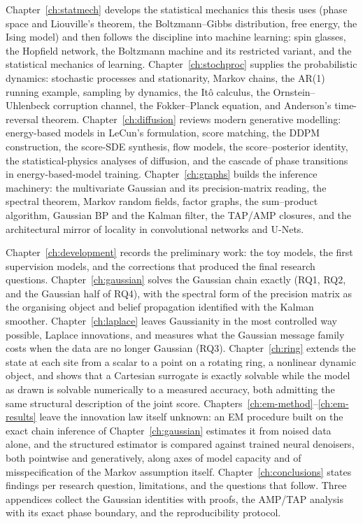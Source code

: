 Chapter~\ref{ch:statmech} develops the statistical mechanics this thesis
uses (phase space and Liouville's theorem, the Boltzmann--Gibbs
distribution, free energy, the Ising model) and then follows the
discipline into machine learning: spin glasses, the Hopfield network,
the Boltzmann machine and its restricted variant, and the statistical
mechanics of learning. Chapter~\ref{ch:stochproc} supplies the
probabilistic dynamics: stochastic processes and stationarity, Markov
chains, the AR(1) running example, sampling by dynamics, the It\^o
calculus, the Ornstein--Uhlenbeck corruption channel, the Fokker--Planck
equation, and Anderson's time-reversal theorem.
Chapter~\ref{ch:diffusion} reviews modern generative modelling:
energy-based models in LeCun's formulation, score matching, the DDPM
construction, the score-SDE synthesis, flow models, the score--posterior
identity, the statistical-physics analyses of diffusion, and the cascade
of phase transitions in energy-based-model training.
Chapter~\ref{ch:graphs} builds the inference machinery: the multivariate
Gaussian and its precision-matrix reading, the spectral theorem, Markov
random fields, factor graphs, the sum--product algorithm, Gaussian BP
and the Kalman filter, the TAP/AMP closures, and the architectural
mirror of locality in convolutional networks and U-Nets.

Chapter~\ref{ch:development} records the preliminary work: the toy
models, the first supervision models, and the corrections that produced
the final research questions. Chapter~\ref{ch:gaussian} solves the
Gaussian chain exactly (RQ1, RQ2, and the Gaussian half of RQ4), with
the spectral form of the precision matrix as the organising object and
belief propagation identified with the Kalman smoother.
Chapter~\ref{ch:laplace} leaves Gaussianity in the most controlled way
possible, Laplace innovations, and measures what the Gaussian message
family costs when the data are no longer Gaussian (RQ3).
Chapter~\ref{ch:ring} extends the state at each site from a scalar to a
point on a rotating ring, a nonlinear dynamic object, and shows that a
Cartesian surrogate is exactly solvable while the model as drawn is
solvable numerically to a measured accuracy, both admitting the same
structural description of the joint score.
Chapters~\ref{ch:em-method}--\ref{ch:em-results} leave the innovation law
itself unknown: an EM procedure built on the exact chain inference of
Chapter~\ref{ch:gaussian} estimates it from noised data alone, and the
structured estimator is compared against trained neural denoisers, both
pointwise and generatively, along axes of model capacity and of
misspecification of the Markov assumption itself.
Chapter~\ref{ch:conclusions} states findings per research question,
limitations, and the questions that follow. Three appendices collect the
Gaussian identities with proofs, the AMP/TAP analysis with its exact
phase boundary, and the reproducibility protocol.
